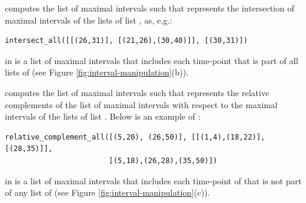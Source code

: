  computes the list  of maximal intervals such that  represents the intersection of maximal intervals of the lists of list , as, e.g.:

{\small
\begin{verbatim}
intersect_all([[(26,31)], [(21,26),(30,40)]], [(30,31)])
\end{verbatim}
}

 in  is a list of maximal intervals that includes each time-point that is part of all lists of  (see Figure \ref{fig:interval-manipulation}(b)).

 computes the list  of maximal intervals such that  represents the relative complements of the list of maximal intervals  with respect to the maximal intervals of the lists of list . Below is an example of \complementall:

{\small
\begin{verbatim}
relative_complement_all([(5,20), (26,50)], [[(1,4),(18,22)],[(28,35)]], 
                        [(5,18),(26,28),(35,50)])
\end{verbatim}
}

 in  is a list of maximal intervals that includes each time-point of  that is not part of any list of  (see Figure \ref{fig:interval-manipulation}(c)).  


